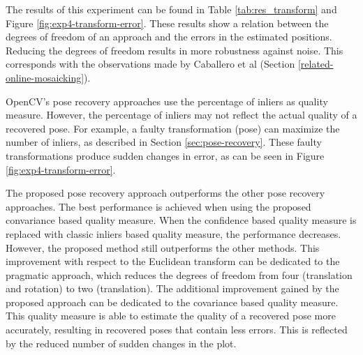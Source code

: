 The results of this experiment can be found in Table \ref{tab:res_transform} and Figure \ref{fig:exp4-transform-error}.
These results show a relation between the degrees of freedom of an approach and the errors in the estimated positions.
Reducing the degrees of freedom results in more robustness against noise.
This corresponds with the observations made by Caballero et al (Section \ref{related-online-mosaicking}).

OpenCV's pose recovery approaches use the percentage of inliers as quality measure.
However, the percentage of inliers may not reflect the actual quality of a recovered pose.
For example, a faulty transformation (pose) can maximize the number of inliers, as described in Section \ref{sec:pose-recovery}.
These faulty transformations produce sudden changes in error, as can be seen in Figure \ref{fig:exp4-transform-error}.

The proposed pose recovery approach outperforms the other pose recovery approaches.
The best performance is achieved when using the proposed convariance based quality measure.
When the confidence based quality measure is replaced with classic inliers based quality measure, the performance decreases.
However, the proposed method still outperforms the other methods.
This improvement with respect to the Euclidean transform can be dedicated to the pragmatic approach, which reduces the degrees of freedom from four (translation and rotation) to two (translation).
The additional improvement gained by the proposed approach can be dedicated to the covariance based quality measure.
This quality measure is able to estimate the quality of a recovered pose more accurately, resulting in recovered poses that contain less errors.
This is reflected by the reduced number of sudden changes in the plot.



